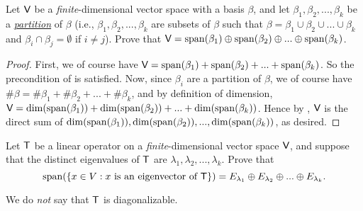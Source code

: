 \begin{exercise} \label{exercise 5.2.22}
Let \(\textsf{V}\) be a \emph{finite}-dimensional vector space with a basis \(\beta\), and let \(\beta_1, \beta_2, ..., \beta_k\) be a \href{https://www.wikiwand.com/en/Partition_of_a_set}{\emph{partition}} of \(\beta\)
(i.e., \(\beta_1, \beta_2, ..., \beta_k\) are subsets of \(\beta\) such that \(\beta = \beta_1 \cup \beta_2 \cup ... \cup \beta_k\) and \(\beta_i \cap \beta_j = \emptyset\) if \(i \ne j\)).
Prove that \(\textsf{V} = \operatorname{span}(\beta_1) \oplus \operatorname{span}(\beta_2) \oplus ... \oplus \operatorname{span}(\beta_k)\).
\end{exercise}

\begin{proof}
First, we of course have \(\textsf{V} = \operatorname{span}(\beta_1) + \operatorname{span}(\beta_2) + ... + \operatorname{span}(\beta_k)\).
So the precondition of  is satisfied.
Now, since \(\beta_i\) are a partition of \(\beta\), we of course have \(\#\beta = \#\beta_1 + \#\beta_2 + ... + \#\beta_k\), and by definition of dimension, \(\textsf{V} = \dim(\operatorname{span}(\beta_1)) + \dim(\operatorname{span}(\beta_2)) + ... + \dim(\operatorname{span}(\beta_k))\).
Hence by , \(\textsf{V}\) is the direct sum of \(\dim(\operatorname{span}(\beta_1)), \dim(\operatorname{span}(\beta_2)), ..., \dim(\operatorname{span}(\beta_k))\), as desired.
\end{proof}

\begin{exercise} \label{exercise 5.2.23}
Let \(\textsf{T}\) be a linear operator on a \emph{finite}-dimensional vector space \(\textsf{V}\), and suppose that the distinct eigenvalues of \(\textsf{T}\) are \(\lambda_1, \lambda_2, ..., \lambda_k\).
Prove that
\[
    \operatorname{span}(\{ x \in V: x \text{ is an eigenvector of } \textsf{T} \}) = E_{\lambda_1} \oplus E_{\lambda_2} \oplus ... \oplus E_{\lambda_k}.
\]
\end{exercise}

\begin{note}
We do \emph{not} say that \(\textsf{T}\) is diagonalizable.
\end{note}

